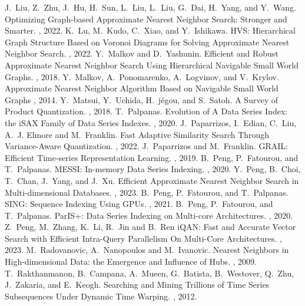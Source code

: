 \documentclass[11pt]{article}
\begin{document}
\begin{thebibliography}{10}
\begin{footnotesize}
J.~Liu, Z.~Zhu, J.~Hu, H.~Sun, L.~Liu, L.~Liu, G.~Dai, H.~Yang, and Y.~Wang. \newblock Optimizing Graph-based Approximate Nearest Neighbor Search: Stronger and Smarter. , 2022.  
K.~Lu, M.~Kudo, C.~Xiao, and Y.~Ishikawa. \newblock HVS: Hierarchical Graph Structure Based on Voronoi Diagrams for Solving Approximate Nearest Neighbor Search. , 2022.
 Y.~Malkov and D.~Yashunin. \newblock  Efficient and Robust Approximate Nearest Neighbor Search Using Hierarchical Navigable Small World Graphs. , 2018.
Y.~Malkov, A.~Ponomarenko, A.~Logvinov, and V.~Krylov. \newblock Approximate Nearest Neighbor Algorithm Based on Navigable Small World Graphs , 2014.
 Y.~Matsui, Y.~Uchida, H.~j{\'e}gou, and S.~Satoh. \newblock A Survey of Product Quantization. , 2018.
T.~Palpanas. \newblock  Evolution of A Data Series Index: the iSAX Family of Data Series Indexes. , 2020.
J.~Paparrizos, I.~Edian, C.~Liu, A.~J. Elmore and M.~Franklin. \newblock Fast Adaptive Similarity Search Through Variance-Aware Quantization. , 2022.
J.~Paparrizos and M.~Franklin. \newblock  GRAIL: Efficient Time-series Representation Learning. , 2019.
B.~Peng, P.~Fatourou, and T.~Palpanas. \newblock MESSI: In-memory Data Series Indexing. , 2020.
Y.~Peng, B.~Choi, T.~Chan, J.~Yang, and J.~Xu. \newblock Efficient Approximate Nearest Neighbor Search in Multi-dimensional Databases. , 2023.
B.~Peng, P.~Fatourou, and T.~Palpanas. \newblock SING: Sequence Indexing Using GPUs. , 2021.
B.~Peng, P.~Fatourou, and T.~Palpanas. \newblock  ParIS+: Data Series Indexing on Multi-core Architectures. , 2020.
Z.~Peng, M.~Zhang, K.~Li, R.~Jin and B.~Ren \newblock iQAN: Fast and Accurate Vector Search with Efficient Intra-Query Parallelism On Multi-Core Architectures. , 2023.  
M.~Radovanovic, A.~Nanopoulos and M.~Ivanovic. \newblock Nearest Neighbors in High-dimensional Data: the Emergence and Influence of Hubs. , 2009.
T.~Rakthanmanon, B.~Campana, A.~Mueen, G.~Batista, B.~Westover, Q.~Zhu, J.~Zakaria, and E.~Keogh. \newblock  Searching and Mining Trillions of Time Series Subsequences Under Dynamic Time Warping. , 2012.

\end{footnotesize}
\end{thebibliography}
\end{document}
